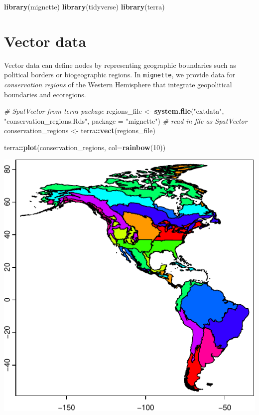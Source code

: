 \documentclass[
]{book}
\newenvironment{Shaded}{\begin{snugshade}}{\end{snugshade}}
\newcommand{\AttributeTok}[1]{\textcolor[rgb]{0.13,0.29,0.53}{#1}}
\newcommand{\CommentTok}[1]{\textcolor[rgb]{0.56,0.35,0.01}{\textit{#1}}}
\newcommand{\DecValTok}[1]{\textcolor[rgb]{0.00,0.00,0.81}{#1}}
\newcommand{\FunctionTok}[1]{\textcolor[rgb]{0.13,0.29,0.53}{\textbf{#1}}}
\newcommand{\NormalTok}[1]{#1}
\newcommand{\OtherTok}[1]{\textcolor[rgb]{0.56,0.35,0.01}{#1}}
\newcommand{\SpecialCharTok}[1]{\textcolor[rgb]{0.81,0.36,0.00}{\textbf{#1}}}
\newcommand{\StringTok}[1]{\textcolor[rgb]{0.31,0.60,0.02}{#1}}
\begin{document}
\begin{Shaded}
\begin{Highlighting}[]
\FunctionTok{library}\NormalTok{(mignette)}
\FunctionTok{library}\NormalTok{(tidyverse)}
\FunctionTok{library}\NormalTok{(terra)}
\end{Highlighting}
\end{Shaded}

\hypertarget{vector-data}{%
\section{Vector data}\label{vector-data}}

Vector data can define nodes by representing geographic boundaries such as political borders or biogeographic regions. In \texttt{mignette}, we provide data for \emph{conservation regions} of the Western Hemisphere that integrate geopolitical boundaries and ecoregions.

\begin{Shaded}
\begin{Highlighting}[]
\CommentTok{\# SpatVector from terra package}
\NormalTok{regions\_file }\OtherTok{\textless{}{-}} \FunctionTok{system.file}\NormalTok{(}\StringTok{"extdata"}\NormalTok{, }\StringTok{"conservation\_regions.Rds"}\NormalTok{, }\AttributeTok{package =} \StringTok{"mignette"}\NormalTok{)}
\CommentTok{\# read in file as SpatVector}
\NormalTok{conservation\_regions }\OtherTok{\textless{}{-}}\NormalTok{ terra}\SpecialCharTok{::}\FunctionTok{vect}\NormalTok{(regions\_file)}

\NormalTok{terra}\SpecialCharTok{::}\FunctionTok{plot}\NormalTok{(conservation\_regions, }\AttributeTok{col=}\FunctionTok{rainbow}\NormalTok{(}\DecValTok{10}\NormalTok{))}
\end{Highlighting}
\end{Shaded}

\includegraphics{Mignette_files/figure-latex/unnamed-chunk-12-1.pdf}
\end{document}
